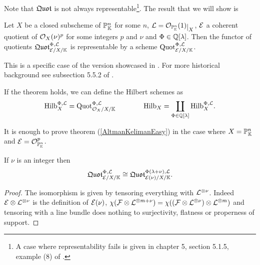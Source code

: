 Note that $\mathfrak{Quot}$ is not always representable\footnote{A case where representability fails is given in chapter 5, section 5.1.5, example (8) of \cite{FGAEXPLAINED}.}. The result that we will show is
\begin{theorem}\label{AltmanKelimanEasy}
Let $X$ be a closed subscheme of $\mathbb{P}^n_{\mathbb{K}}$ for some $n$, $\Lc=\Oc_{\Pj^n_\K}(1)\res X$, $\mathcal{E}$ a coherent quotient of $\mathcal{O}_{X}(\nu)^p$ for some integers $p$ and $\nu$ and $\Phi\in\mathbb{Q}[\lambda]$. Then the functor of quotients $\mathfrak{Quot}^{\Phi,\mathcal{L}}_{\mathcal{E}/X/\mathbb{K}}$ is representable by a scheme $\mathrm{Quot}^{\Phi,\mathcal{L}}_{\mathcal{E}/X/\mathbb{K}}$. 
\end{theorem}
This is a specific case of the version showcased in \cite{ALTMAN198050}. For more historical background see subsection 5.5.2 of \cite{FGAEXPLAINED}.

\begin{remark}
If the theorem holds, we can define the Hilbert schemes as
\[\mathrm{Hilb}^{\Phi,\mathcal{L}}_{X}=\mathrm{Quot}^{\Phi,\mathcal{L}}_{\mathcal{O}_{X}/X/\mathbb{K}}\qquad\qquad \mathrm{Hilb}_X=\coprod_{\Phi\in\mathbb{Q}[\lambda]}\mathrm{Hilb}^{\Phi,\mathcal{L}}_{X}.\]
\end{remark}

\begin{proposition}\label{specialCaseOfExistence}
It is enough to prove theorem (\ref{AltmanKelimanEasy}) in the case where $X=\mathbb{P}^n_{\mathbb{K}}$ and $\mathcal{E}=\mathcal{O}_{\mathbb{P}^n_{\mathbb{K}}}^p$.
\end{proposition}


\begin{lemma}\label{NoTwistLemma}
If $\nu$ is an integer then 
\[\mathfrak{Quot}^{\Phi,\mathcal{L}}_{\mathcal{E}/X/\mathbb{K}}\cong \mathfrak{Quot}^{\Phi(\lambda+\nu),\mathcal{L}}_{\mathcal{E}(\nu)/X/\mathbb{K}}.\]
\end{lemma}
\begin{proof}
The isomorphism is given by tensoring everything with $\mathcal{L}^{\otimes \nu}$. Indeed $\mathcal{E}\otimes \mathcal{L}^{\otimes \nu}$ is the definition of $\mathcal{E}(\nu)$, $\chi(\mathcal{F}\otimes \mathcal{L}^{\otimes m+\nu})=\chi((\mathcal{F}\otimes\mathcal{L}^{\otimes \nu})\otimes \mathcal{L}^{\otimes m})$ and tensoring with a line bundle does nothing to surjectivity, flatness or properness of support.
\end{proof}

